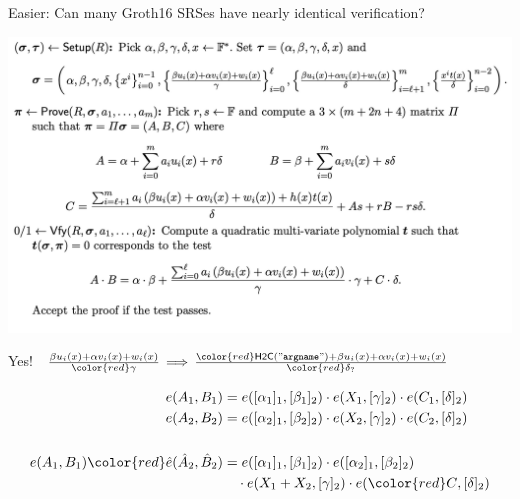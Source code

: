 \documentclass{beamer}
\begin{document}
\begin{frame}[t]

Easier:  Can many Groth16 SRSes have nearly identical verification? \\ \bigskip

\includegraphics[width=\textwidth]{../images/Groth16.png}

\bigskip

Yes! \,
${\beta u_i(x) + \alpha v_i(x) + w_i(x) \over {\color{red}\gamma}}
\,\Longrightarrow\,
{{\color{red}\mathsf{H2C}(\mathtt{"argname")}} + \beta u_i(x) + \alpha v_i(x) + w_i(x) \over {\color{red}\delta_?}}$

\end{frame}



\begin{frame}

$$ \begin{aligned}
e(A_1,B_1) &= e([\alpha_1]_1, [\beta_1]_2) \cdot e(X_1, [\gamma]_2) \cdot e(C_1, [\delta]_2) \\
e(A_2,B_2) &= e([\alpha_2]_1, [\beta_2]_2) \cdot e(X_2, [\gamma]_2) \cdot e(C_2, [\delta]_2) \\
& \\
e(A_1,B_1) {\color{red}\hat{e}(\hat{A}_2,\hat{B}_2)}  &= e([\alpha_1]_1, [\beta_1]_2) \cdot e([\alpha_2]_1, [\beta_2]_2) \\
&\quad \cdot e(X_1 + X_2, [\gamma]_2) \cdot e({\color{red}C}, [\delta]_2) \\
\end{aligned} $$

\end{frame}
\end{document}
